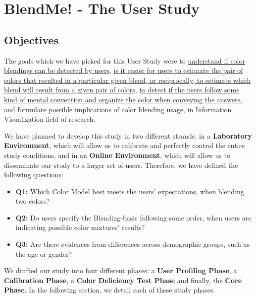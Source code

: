
\section{BlendMe! - The User Study}
\label{sec:blendme}

\subsection{Objectives}
%
The goals which we have picked for this User Study were to \ul{understand if color blendings
can be detected by users}, \ul{is it easier for users to estimate the pair of colors
that resulted in a particular given blend, or reciprocally, to estimate which blend will
result from a given pair of colors}, \ul{to detect if the users follow some kind of mental
convention and organize the color when conveying the answers}, and formulate possible
implications of color blending usage, in Information Visualization field of research. \par
%
We have planned to develop this study in two different strands: in a \textbf{Laboratory
Environment}, which will allow us to calibrate and perfectly control the entire study
conditions, and in an \textbf{Online Environment}, which will allow us to disseminate our
study to a larger set of users. Therefore, we have defined the following questions:
%
\begin{itemize}
	\item \textbf{Q1:} Which Color Model best meets the users' expectations, when
  blending two colors?
	\item \textbf{Q2:} Do users specify the Blending-basis following some order, when
  users are indicating possible color mixtures' results?
	\item \textbf{Q3:} Are there evidences from differences across demographic groups, such
  as the age or gender?
\end{itemize}
%
We drafted our study into four different phases: a \textbf{User Profiling Phase},
a \textbf{Calibration Phase}, a \textbf{Color Deficiency Test Phase} and finally, the
\textbf{Core Phase}. In the following section, we detail each of these study phases.
%
